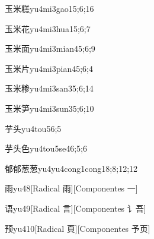 \begin{verbete}{玉米糕}{yu4mi3gao1}{5;6;16}
\end{verbete}

\begin{verbete}{玉米花}{yu4mi3hua1}{5;6;7}
\end{verbete}

\begin{verbete}{玉米面}{yu4mi3mian4}{5;6;9}
\end{verbete}

\begin{verbete}{玉米片}{yu4mi3pian4}{5;6;4}
\end{verbete}

\begin{verbete}{玉米糁}{yu4mi3san3}{5;6;14}
\end{verbete}

\begin{verbete}{玉米笋}{yu4mi3sun3}{5;6;10}
\end{verbete}

\begin{verbete}{芋头}{yu4tou5}{6;5}
\end{verbete}

\begin{verbete}{芋头色}{yu4tou5se4}{6;5;6}
\end{verbete}

\begin{verbete}{郁郁葱葱}{yu4yu4cong1cong1}{8;8;12;12}
\end{verbete}

\begin{verbete}{雨}{yu4}{8}[Radical 雨][Componentes 一]
\end{verbete}

\begin{verbete}{语}{yu4}{9}[Radical 言][Componentes 讠吾]
\end{verbete}

\begin{verbete}{预}{yu4}{10}[Radical 頁][Componentes 予页]
\end{verbete}


